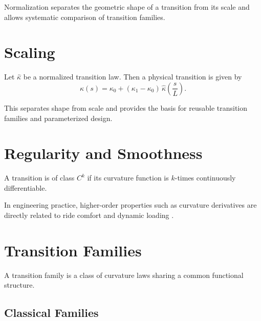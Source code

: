 \begin{remark}
Normalization separates the geometric shape of a transition from its
scale and allows systematic comparison of transition families.
\end{remark}

\section{Scaling}

\begin{proposition}
Let $\widehat{\kappa}$ be a normalized transition law.
Then a physical transition is given by
\[
\kappa(s)
=
\kappa_0 + (\kappa_1-\kappa_0)\,
\widehat{\kappa}\!\left(\frac{s}{L}\right).
\]
\end{proposition}

\begin{remark}
This separates shape from scale and provides the basis for reusable
transition families and parameterized design.
\end{remark}

\section{Regularity and Smoothness}

\begin{definition}
A transition is of class $C^k$ if its curvature function is $k$-times
continuously differentiable.
\end{definition}

\begin{remark}
In engineering practice, higher-order properties such as curvature
derivatives are directly related to ride comfort and dynamic loading
\cite{Mieloszyk2012Transition,Koc2017SmoothedEnds}.
\end{remark}


\section{Transition Families}

\begin{definition}
A transition family is a class of curvature laws sharing a common
functional structure.
\end{definition}

\subsection{Classical Families}

